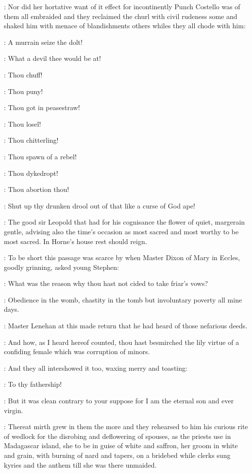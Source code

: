 \documentclass[12pt]{article}
\begin{document}
: Nor did her hortative want of it effect for
incontinently Punch Costello was of them all embraided and they reclaimed
the churl with civil rudeness some and shaked him with menace of
blandishments others whiles they all chode with him:

\Ly: A murrain seize the dolt!

\Md: What a devil thee would be at!

\Cr: Thou chuff!

\Dx: Thou puny!

\Ln: Thou got in peasestraw!

\Ly: Thou losel!

\Md: Thou chitterling!

\Cr: Thou spawn of a rebel!

\Ln: Thou dykedropt!

\Dx: Thou abortion thou!

\SD: Shut up thy drunken drool out of that like a curse of God ape!

: The good sir Leopold that had for his cognisance
the flower of quiet, margerain gentle, advising also the time's occasion
as most sacred and most worthy to be most sacred. In Horne's house rest
should reign.



: To be short this passage was scarce by when Master Dixon of Mary in
Eccles, goodly grinning, asked young Stephen:

\Dx: What was the reason why thou hast not cided to take friar's vows?

\SD: Obedience in the womb, chastity in the tomb
but involuntary poverty all mine days.

: Master Lenehan at this made return that he had heard of
those nefarious deeds.

\Ln: And how, as I heard hereof counted, thou hast besmirched the lily
virtue of a confiding female which was corruption of minors.

: And they all intershowed it too, waxing merry and toasting:

\All: To thy fathership!

\SD: But it was clean contrary to your suppose for I am the
eternal son and ever virgin.

: Thereat mirth grew in them the more and they
rehearsed to him his curious rite of wedlock for the disrobing and
deflowering of spouses, as the priests use in Madagascar island, she to
be in guise of white and saffron, her groom in white and grain, with
burning of nard and tapers, on a bridebed while clerks sung kyries and
the anthem 
till she was there unmaided.
\end{document}
